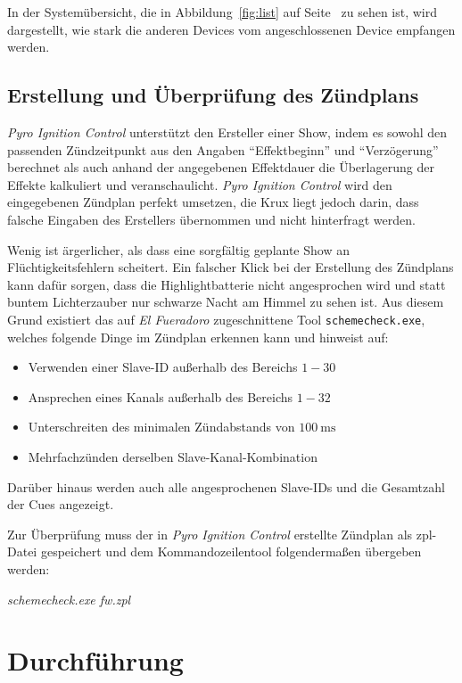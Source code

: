 \documentclass[paper=a4, parskip, numbers=noenddot, toc=listof, headsepline]{scrbook}
\newcommand{\pic}{\emph{Pyro Ignition Control}}
\newcommand{\anlage}{\emph{El Fueradoro}}
\begin{document}
				In der Systemübersicht, die in Abbildung~\ref{fig:list} auf Seite~\pageref{fig:list} zu sehen ist, wird dargestellt, wie stark die anderen Devices vom angeschlossenen Device empfangen werden.

			\subsection{Erstellung und Überprüfung des Zündplans}

					{\pic} unterstützt den Ersteller einer Show, indem es sowohl den passenden Zündzeitpunkt aus den Angaben \enquote{Effektbeginn} und \enquote{Verzögerung} berechnet als auch anhand der angegebenen Effektdauer die Überlagerung der Effekte kalkuliert und veranschaulicht.
				\pic{} wird den eingegebenen Zündplan perfekt umsetzen, die Krux liegt jedoch darin, dass falsche Eingaben des Erstellers übernommen und nicht hinterfragt werden.

				Wenig ist ärgerlicher, als dass eine sorgfältig geplante Show an Flüchtigkeitsfehlern scheitert. Ein falscher Klick bei der Erstellung des Zündplans kann dafür sorgen, dass die Highlightbatterie nicht angesprochen wird und statt buntem Lichterzauber nur schwarze Nacht am Himmel zu sehen ist. Aus diesem Grund existiert das auf {\anlage} zugeschnittene Tool \texttt{schemecheck.exe}, welches folgende Dinge im Zündplan erkennen kann und hinweist auf:
				\begin{itemize}
					\item
					      Verwenden einer Slave-ID außerhalb des Bereichs $1-30$
					\item
					      Ansprechen eines Kanals außerhalb des Bereichs $1-32$
					\item
					      Unterschreiten des minimalen Zündabstands von $\SI{100}{\milli\second}$
					\item
					      Mehrfachzünden derselben Slave-Kanal-Kombination
				\end{itemize}
				Darüber hinaus werden auch alle angesprochenen Slave-IDs und die Gesamtzahl der Cues angezeigt.

				Zur Überprüfung muss der in {\pic} erstellte Zündplan als zpl-Datei gespeichert und dem Kommandozeilentool folgendermaßen übergeben werden:
				\begin{center}
					\emph{schemecheck.exe fw.zpl}
				\end{center}

		\section{Durchführung}
\end{document}
